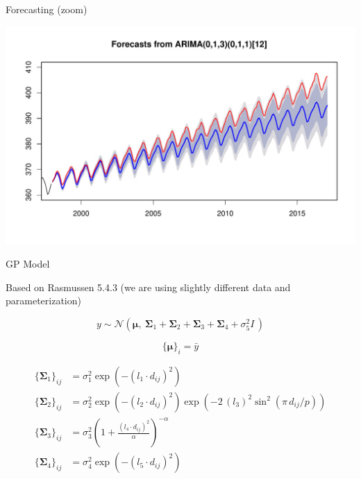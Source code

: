 \documentclass[11pt,ignorenonframetext,]{beamer}
\begin{document}
\begin{frame}{Forecasting (zoom)}

\includegraphics{Lec15_files/figure-beamer/unnamed-chunk-10-1.pdf}

\end{frame}

\begin{frame}[t]{GP Model}

Based on Rasmussen 5.4.3 (we are using slightly different data and
parameterization)

\[ y \sim \mathcal{N}(\bm\mu,~ \bm\Sigma_1 + \bm\Sigma_2 + \bm\Sigma_3 + \bm\Sigma_4 + \sigma^2_5 \mathit{I}\,) \]

\[\{\bm\mu\}_i = \bar{y}\]

\[
\begin{aligned}
\{\bm\Sigma_1\}_{ij} &= \sigma^2_1 \exp\left(-(l_1 \cdot d_{ij})^2\right) \\
\{\bm\Sigma_2\}_{ij} &= \sigma^2_2 \exp\left(-(l_2 \cdot d_{ij})^2\right)\exp\left(-2 \, (l_3)^2  \sin^2(\pi \, d_{ij} / p)\right) \\
\{\bm\Sigma_3\}_{ij} &= \sigma^2_3 \left(1+\frac{(l_4 \cdot d_{ij})^2}{\alpha}\right)^{-\alpha} \\
\{\bm\Sigma_4\}_{ij} &= \sigma^2_4 \exp\left(-(l_5 \cdot d_{ij})^2\right)
\end{aligned}
\]

\end{frame}
\end{document}
